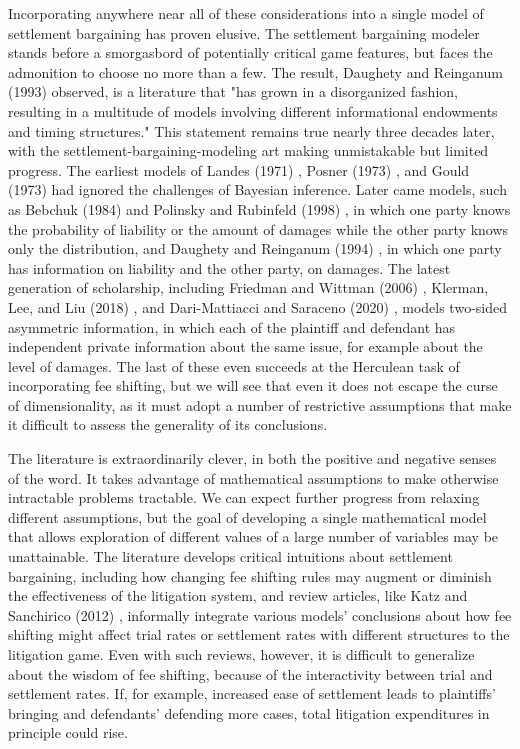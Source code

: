 \documentclass{article}
\begin{document}
Incorporating anywhere near all of these considerations into a single model of settlement bargaining has proven elusive. The settlement bargaining modeler stands before a smorgasbord of potentially critical game features, but faces the admonition to choose no more than a few. The result, Daughety and Reinganum (1993) \cite{daughetyreinganum1993} observed, is a literature that "has grown in a disorganized fashion, resulting in a multitude of models involving different informational endowments and timing structures." This statement remains true nearly three decades later, with the  settlement-bargaining-modeling art making unmistakable but limited progress. The earliest models of Landes (1971) \cite{landes}, Posner (1973) \cite{posner}, and Gould (1973) \cite{gould} had ignored the challenges of Bayesian inference. Later came models, such as Bebchuk (1984) \cite{bebchuk84} and Polinsky and Rubinfeld (1998) \cite{polinskyrubinfeld}, in which one party knows the probability of liability or the amount of damages while the other party knows only the distribution, and Daughety and Reinganum (1994) \cite{daughetyreinganum1994}, in which one party has information on liability and the other party, on damages. The latest generation of scholarship, including Friedman and Wittman (2006) \cite{friedmanwittman}, Klerman, Lee, and Liu (2018) \cite{klermanleeliu}, and Dari-Mattiacci and Saraceno (2020) \cite{darimatiaccisaraceno}, models two-sided asymmetric information, in which each of the plaintiff and defendant has independent private information about the same issue, for example about the level of damages. The last of these even succeeds at the Herculean task of incorporating fee shifting, but we will see that even it does not escape the curse of dimensionality, as it must adopt a number of restrictive assumptions that make it difficult to assess the generality of its conclusions.

The literature is extraordinarily clever, in both the positive and negative senses of the word. It takes advantage of mathematical assumptions to make otherwise intractable problems tractable. We can expect further progress from relaxing different assumptions, but the goal of developing a single mathematical model that allows exploration of different values of a large number of variables may be unattainable. The literature develops critical intuitions about settlement bargaining, including how changing fee shifting rules may augment or diminish the effectiveness of the litigation system, and review articles, like Katz and Sanchirico (2012) \cite{katzsanchirico}, informally integrate various models' conclusions about how fee shifting might affect trial rates or settlement rates with different structures to the litigation game. Even with such reviews, however, it is difficult to generalize about the wisdom of fee shifting, because of the interactivity between trial and settlement rates. If, for example, increased ease of settlement leads to plaintiffs' bringing and defendants' defending more cases, total litigation expenditures in principle could rise. 
\end{document}

